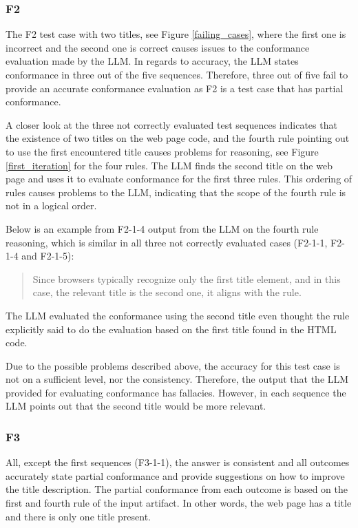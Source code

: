 \subsubsection{F2}

The F2 test case with two titles, see Figure \ref{failing_cases}, where the first one is incorrect and the second one is correct causes issues to the conformance evaluation made by the LLM. In regards to accuracy, the LLM states conformance in three out of the five sequences. Therefore, three out of five fail to provide an accurate conformance evaluation as F2 is a test case that has partial conformance.

A closer look at the three not correctly evaluated test sequences indicates that the existence of two titles on the web page code, and the fourth rule pointing out to use the first encountered title causes problems for reasoning, see Figure \ref{first_iteration} for the four rules. The LLM finds the second title on the web page and uses it to evaluate conformance for the first three rules. This ordering of rules causes problems to the LLM, indicating that the scope of the fourth rule is not in a logical order.

Below is an example from F2-1-4 output from the LLM on the fourth rule reasoning, which is similar in all three not correctly evaluated cases (F2-1-1, F2-1-4 and F2-1-5): \blockquote{Since browsers typically recognize only the first title element, and in this case, the relevant title is the second one, it aligns with the rule.}. The LLM evaluated the conformance using the second title even thought the rule explicitly said to do the evaluation based on the first title found in the HTML code.

Due to the possible problems described above, the accuracy for this test case is not on a sufficient level, nor the consistency. Therefore, the output that the LLM provided for evaluating conformance has fallacies. However, in each sequence the LLM points out that the second title would be more relevant.

\subsubsection{F3}

All, except the first sequences (F3-1-1), the answer is consistent and all outcomes accurately state partial conformance and provide suggestions on how to improve the title description. The partial conformance from each outcome is based on the first and fourth rule of the input artifact. In other words, the web page has a title and there is only one title present. 

